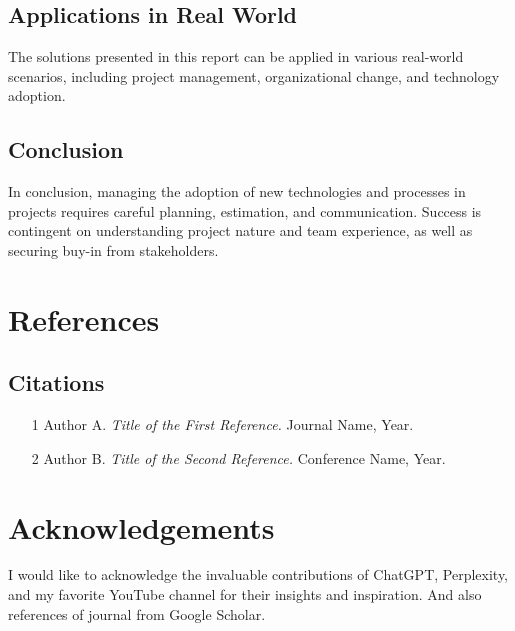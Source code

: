 \documentclass{article}
\begin{document}
\subsection{Applications in Real World}
The solutions presented in this report can be applied in various real-world scenarios, including project management, organizational change, and technology adoption.
\subsection{Conclusion}
In conclusion, managing the adoption of new technologies and processes in projects requires careful planning, estimation, and communication. Success is contingent on understanding project nature and team experience, as well as securing buy-in from stakeholders.

\section{References}
\subsection{Citations}
\begin{itemize}
  \item [1] Author A. \textit{Title of the First Reference.} Journal Name, Year.
  \item [2] Author B. \textit{Title of the Second Reference.} Conference Name, Year.
\end{itemize}


\section{Acknowledgements}
I would like to acknowledge the invaluable contributions of ChatGPT, Perplexity, and my favorite YouTube channel for their insights and inspiration. And also references of journal from Google Scholar.
\end{document}
